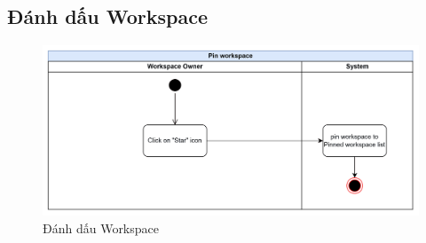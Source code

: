 \subsection{Đánh dấu Workspace}
    \begin{figure}[H]
        \centering
        \includegraphics[width=\linewidth]{Content/Phân tích và thiết kế hệ thống/documents/Sơ đồ hoạt động/images/pinWorkspace.png}
        \vspace{0.5cm}
        \caption{Đánh dấu Workspace}
        \label{fig:Đánh dấu Workspace}
    \end{figure}